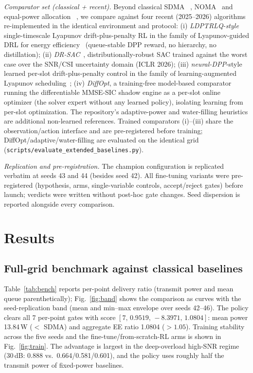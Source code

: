 \documentclass[journal]{IEEEtran}
\begin{document}
\emph{Comparator set (classical + recent).} Beyond classical SDMA
~\cite{he2023eemumimo}, NOMA~\cite{wang2023nomaee} and equal-power allocation
~\cite{falloun2025fixedpa}, we compare against four recent (2025--2026)
algorithms re-implemented in the identical environment and protocol: (i) \emph{LDPTRLQ-style} single-timescale
Lyapunov drift-plus-penalty RL in the family of Lyapunov-guided DRL for energy
efficiency~\cite{zhu2025lyapguid} (queue-stable DPP reward, no hierarchy, no
distillation); (ii) \emph{DR-SAC}~\cite{cui2025drsac},
distributionally-robust SAC trained against the worst case over the SNR/CSI
uncertainty domain (ICLR 2026); (iii) \emph{neural-DPP}-style learned per-slot
drift-plus-penalty control in the family of learning-augmented Lyapunov
scheduling~\cite{zakeri2024lyaplearn}; (iv)
\emph{DiffOpt}, a training-free model-based comparator running the differentiable
MMSE-SIC shadow engine as a per-slot online optimizer (the solver expert without
any learned policy), isolating learning from per-slot optimization. The
repository's adaptive-power and water-filling heuristics are additional
non-learned references. Trained comparators (i)--(iii) share the observation/action
interface and are pre-registered before training; DiffOpt/adaptive/water-filling
are evaluated on the identical grid (\texttt{scripts/evaluate\_extended\_baselines.py}).

\emph{Replication and pre-registration.} The champion configuration is replicated
verbatim at seeds 43 and 44 (besides seed 42). All fine-tuning variants were
pre-registered (hypothesis, arms, single-variable controls, accept/reject gates)
before launch; verdicts were written without post-hoc gate changes. Seed
dispersion is reported alongside every comparison.

\section{Results}
\label{sec:results}

\subsection{Full-grid benchmark against classical baselines}
Table~\ref{tab:bench} reports per-point delivery ratio (transmit power and mean
queue parenthetically); Fig.~\ref{fig:band} shows the comparison as curves with
the seed-replication band (mean and min--max envelope over seeds 42--46). The
policy clears all 7 per-point gates with score
$[7,\,0.9519,\,-8.3971,\,1.0804]$: mean power 13.84\,W ($<$ SDMA) and aggregate EE
ratio 1.0804 ($>1.05$). Training stability across the five seeds and the
fine-tune/from-scratch-RL arms is shown in Fig.~\ref{fig:train}. The advantage is
largest in the deep-overload high-SNR
regime (30\,dB: 0.888 vs.\ 0.664/0.581/0.601), and the policy uses roughly half
the transmit power of fixed-power baselines.
\end{document}
